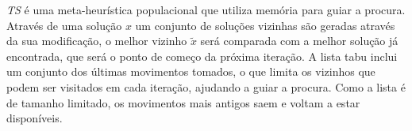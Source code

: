 \textit{TS} é uma meta-heurística populacional que utiliza memória para guiar a procura. Através de uma solução $x$ um conjunto de soluções vizinhas são geradas através da sua modificação, o melhor vizinho $\tilde{x}$ será comparada com a melhor solução já encontrada, que será o ponto de começo da próxima iteração. A lista tabu inclui um conjunto dos últimas movimentos tomados, o que limita os vizinhos que podem ser visitados em cada iteração, ajudando a guiar a procura. Como a lista é de tamanho limitado, os movimentos mais antigos saem e voltam a estar disponíveis.